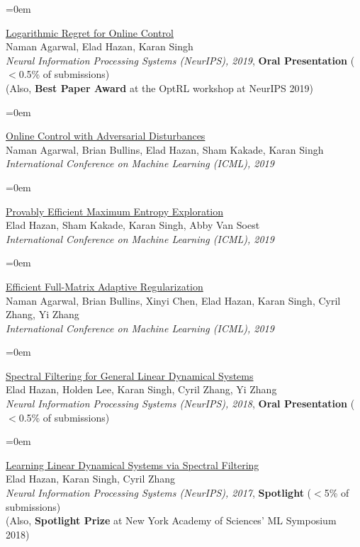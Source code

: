 \documentclass{scrartcl}
\newcommand{\Description}[1]{\hangindent=0em\hangafter=0\noindent\raggedright {#1}\par\normalsize\vspace{1em}}
\begin{document}
\begin{cv}{}
\Description{\href{https://papers.nips.cc/paper/2019/file/78719f11fa2df9917de3110133506521-Paper.pdf}{Logarithmic Regret for Online Control}\\ Naman Agarwal, Elad Hazan, Karan Singh\\ \textit{Neural Information Processing Systems (NeurIPS), 2019}, \textbf{Oral Presentation} ($<$0.5\% of submissions) \\ (Also, \textbf{Best Paper Award} at the OptRL workshop at NeurIPS 2019)}


\Description{\href{http://proceedings.mlr.press/v97/agarwal19c/agarwal19c.pdf}{Online Control with Adversarial Disturbances} \\Naman Agarwal, Brian Bullins, Elad Hazan, Sham Kakade, Karan Singh\\ \textit{International Conference on Machine Learning (ICML), 2019}}


\Description{\href{http://proceedings.mlr.press/v97/hazan19a/hazan19a.pdf}{Provably Efficient Maximum Entropy Exploration}\\ Elad Hazan, Sham Kakade, Karan Singh, Abby Van Soest \\ \textit{International Conference on Machine Learning (ICML), 2019}}

\Description{\href{http://proceedings.mlr.press/v97/agarwal19b/agarwal19b.pdf}{Efficient Full-Matrix Adaptive Regularization} \\ Naman Agarwal, Brian Bullins, Xinyi Chen, Elad Hazan, Karan Singh, Cyril Zhang, Yi Zhang \\ \textit{International Conference on Machine Learning (ICML), 2019}}

\Description{\href{https://papers.nips.cc/paper/7714-spectral-filtering-for-general-linear-dynamical-systems.pdf}{Spectral Filtering for General Linear Dynamical Systems} \\Elad Hazan, Holden Lee, Karan Singh, Cyril Zhang, Yi Zhang\\ \textit{Neural Information Processing Systems (NeurIPS), 2018}, \textbf{Oral Presentation} ($<$0.5\% of submissions)}

\Description{\href{https://papers.nips.cc/paper/7247-learning-linear-dynamical-systems-via-spectral-filtering.pdf}{Learning Linear Dynamical Systems via Spectral Filtering}\\ Elad Hazan, Karan Singh, Cyril Zhang\\ \textit{Neural Information Processing Systems (NeurIPS), 2017}, \textbf{Spotlight} ($<$5\% of submissions)\\ (Also, \textbf{Spotlight Prize} at New York Academy of Sciences' ML Symposium 2018)}


\end{cv}
\end{document}

